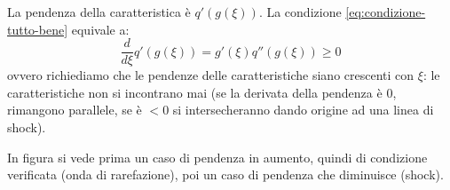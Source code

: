 \documentclass[10pt,a4paper,twoside,openright]{book}
\begin{document}
\begin{nb}
	La pendenza della caratteristica è $\displaystyle q'( g( \xi )) .$ La condizione \eqref{eq:condizione-tutto-bene} equivale a:
	\begin{equation*}
		\frac{d}{d\xi } q'( g( \xi )) =g'( \xi ) q''( g( \xi )) \geqslant 0
	\end{equation*}
	ovvero richiediamo che le pendenze delle caratteristiche siano crescenti con $\displaystyle \xi $: le caratteristiche non si incontrano mai (se la derivata della pendenza è $\displaystyle 0$, rimangono parallele, se è $\displaystyle < 0$ si intersecheranno dando origine ad una linea di shock).

	In figura si vede prima un caso di pendenza in aumento, quindi di condizione verificata (onda di rarefazione), poi un caso di pendenza che diminuisce (shock).

	\begin{figure}[H]
		\centering

	\begin{tikzpicture}[x=0.75pt,y=0.75pt,yscale=-1,xscale=1]


\end{tikzpicture}
\end{figure}
\end{nb}
\end{document}
